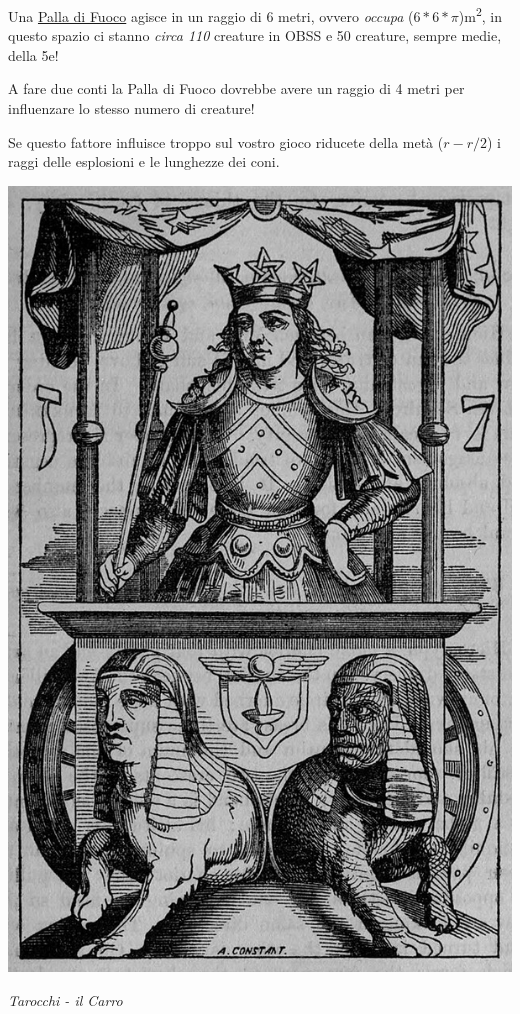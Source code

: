 \begin{multicols}{2}
Una \hyperlink{Palla di Fuoco}{Palla di Fuoco} agisce in un raggio di 6 metri, ovvero \emph{occupa} ($6*6*\pi$)\si{m^{2}}, in questo spazio ci stanno \emph{circa 110} creature in OBSS e 50 creature, sempre medie, della 5e!

A fare due conti la Palla di Fuoco dovrebbe avere un raggio di 4 metri per influenzare lo stesso numero di creature!

Se questo fattore influisce troppo sul vostro gioco riducete della metà ($r-r/2$) i raggi delle esplosioni e le lunghezze dei coni.

\begin{center}
	\includegraphics[width=0.7\linewidth]{immagini/The_Chariot_of_Hermes.png}

	\emph{Tarocchi - il Carro}
\end{center}

\end{multicols}



